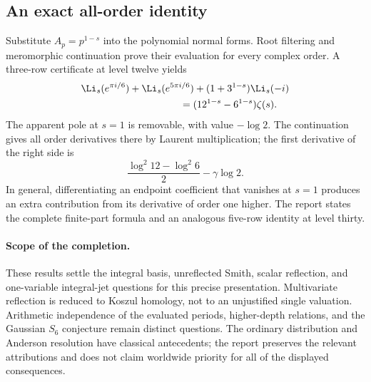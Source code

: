 \subsection{An exact all-order identity}
Substitute $A_p=p^{1-s}$ into the polynomial normal forms. Root filtering
and meromorphic continuation prove their evaluation for every complex
order. A three-row certificate at level twelve yields
\begin{align}
 &\Li_s(e^{\pi i/6})+\Li_s(e^{5\pi i/6})
       +(1+3^{1-s})\Li_s(-i)\nonumber\\
 &\hspace{35mm}=(12^{1-s}-6^{1-s})\zeta(s).
 \label{intdist:eq:level12}
\end{align}
The apparent pole at $s=1$ is removable, with value $-\log2$.
The continuation gives all order derivatives there by Laurent
multiplication; the first derivative of the right side is
\[
 \frac{\log^2 12-\log^2 6}{2}-\gamma\log2.
\]
In general, differentiating an endpoint coefficient that vanishes at
$s=1$ produces an extra contribution from its derivative of order
one higher. The report states the complete finite-part formula and an
analogous five-row identity at level thirty.

\paragraph{Scope of the completion.}
These results settle the integral basis, unreflected Smith, scalar
reflection, and one-variable integral-jet questions for this precise
presentation. Multivariate reflection is reduced to Koszul homology,
not to an unjustified single valuation. Arithmetic independence of the
evaluated periods, higher-depth relations, and the Gaussian $S_6$
conjecture remain distinct questions. The ordinary distribution and
Anderson resolution have classical antecedents; the report preserves
the relevant attributions and does not claim worldwide priority for
all of the displayed consequences.
